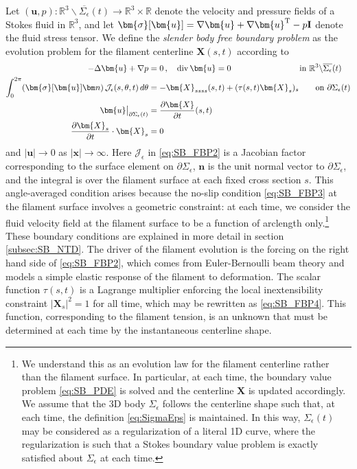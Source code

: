 \documentclass[11pt,reqno]{amsart}
\newcommand{\R}{\mathbb{R}}
\newcommand{\bu}{\bm{u}}
\newcommand{\bx}{\bm{x}}
\newcommand{\X}{\bm{X}}
\newcommand{\p}{\partial}
\renewcommand{\div}{{\rm{div}\,}}
\newcommand{\abs}[1]{\left\lvert #1 \right\rvert}
\newcommand{\mc}[1]{\mathcal{#1}}
\theoremstyle{definition}
\begin{document}
Let $(\bu,p):\R^3\backslash\overline{\Sigma_\epsilon}(t) \to \R^3\times \R$ denote the velocity and pressure fields of a Stokes fluid in $\R^3$, and let $\bm{\sigma}[\bu]=\nabla\bu+\nabla\bu^{\rm T}-p{\bf I}$ denote the fluid stress tensor. 
We define the \emph{slender body free boundary problem} as the evolution problem for the filament centerline $\X(s,t)$ according to 
\begin{align}
-\Delta \bu + \nabla p &=0\,, \quad \div\bu=0  \hspace{2.9cm} \text{in }\R^3\backslash\overline{\Sigma_\epsilon}(t)  \label{eq:SB_FBP1}\\
\int_0^{2\pi}(\bm{\sigma}[\bu]{\bm n})\,\mc{J}_\epsilon(s,\theta,t)\,d\theta &= -\X_{ssss}(s,t)+(\tau(s,t)\X_s)_s \qquad \text{on } \p\Sigma_\epsilon(t)
\label{eq:SB_FBP2}\\
\bu\big|_{\p\Sigma_\epsilon(t)} &= \frac{\p\X}{\p t}(s,t) \label{eq:SB_FBP3}\\
\frac{\p\X_s}{\p t}\cdot\X_s &=0  \label{eq:SB_FBP4}
\end{align}
and $\abs{\bu}\to0$ as $\abs{\bx}\to\infty$.
%
Here $\mc{J}_\epsilon$ in \eqref{eq:SB_FBP2} is a Jacobian factor corresponding to the surface element on $\p\Sigma_\epsilon$, $\bm{n}$ is the unit normal vector to $\p\Sigma_\epsilon$, and the integral is over the filament surface at each fixed cross section $s$. This angle-averaged condition arises because the no-slip condition \eqref{eq:SB_FBP3} at the filament surface involves a geometric constraint: at each time, we consider the fluid velocity field at the filament surface to be a function of arclength only.\footnote{We understand this as an evolution law for the filament centerline rather than the filament surface. In particular, at each time, the boundary value problem \eqref{eq:SB_PDE} is solved and the centerline $\X$ is updated accordingly. We assume that the 3D body $\Sigma_\epsilon$ follows the centerline shape such that, at each time, the definition \eqref{eq:SigmaEps} is maintained. 
In this way, $\Sigma_\epsilon(t)$ may be considered as a regularization of a literal 1D curve, where the regularization is such that a Stokes boundary value problem is exactly satisfied about $\Sigma_\epsilon$ at each time.} 
%
These boundary conditions are explained in more detail in section \ref{subsec:SB_NTD}. The driver of the filament evolution is the forcing on the right hand side of \eqref{eq:SB_FBP2}, which comes from Euler-Bernoulli beam theory and models a simple elastic response of the filament to deformation. The scalar function $\tau(s,t)$ is a Lagrange multiplier enforcing the local inextensibility constraint $\abs{\X_s}^2=1$ for all time, which may be rewritten as \eqref{eq:SB_FBP4}. This function, corresponding to the filament tension, is an unknown that must be determined at each time by the instantaneous centerline shape. 
\end{document}
